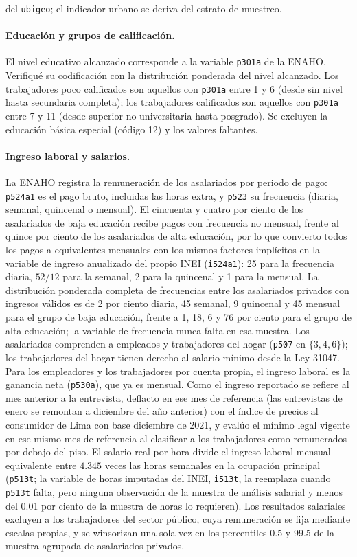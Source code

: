 del \texttt{ubigeo}; el indicador urbano se deriva del estrato de muestreo.

\paragraph{Educación y grupos de calificación.} El nivel educativo alcanzado corresponde a la variable \texttt{p301a} de la ENAHO. Verifiqué su codificación con la distribución ponderada del nivel alcanzado. Los trabajadores poco calificados son aquellos con \texttt{p301a} entre 1 y 6 (desde sin nivel hasta secundaria completa); los trabajadores calificados son aquellos con \texttt{p301a} entre 7 y 11 (desde superior no universitaria hasta posgrado). Se excluyen la educación básica especial (código 12) y los valores faltantes.

\paragraph{Ingreso laboral y salarios.} La ENAHO registra la remuneración de los asalariados por periodo de pago: \texttt{p524a1} es el pago bruto, incluidas las horas extra, y \texttt{p523} su frecuencia (diaria, semanal, quincenal o mensual). El cincuenta y cuatro por ciento de los asalariados de baja educación recibe pagos con frecuencia no mensual, frente al quince por ciento de los asalariados de alta educación, por lo que convierto todos los pagos a equivalentes mensuales con los mismos factores implícitos en la variable de ingreso anualizado del propio INEI (\texttt{i524a1}): 25 para la frecuencia diaria, $52/12$ para la semanal, 2 para la quincenal y 1 para la mensual. La distribución ponderada completa de frecuencias entre los asalariados privados con ingresos válidos es de 2 por ciento diaria, 45 semanal, 9 quincenal y 45 mensual para el grupo de baja educación, frente a 1, 18, 6 y 76 por ciento para el grupo de alta educación; la variable de frecuencia nunca falta en esa muestra. Los asalariados comprenden a empleados y trabajadores del hogar (\texttt{p507} en $\{3,4,6\}$); los trabajadores del hogar tienen derecho al salario mínimo desde la Ley 31047. Para los empleadores y los trabajadores por cuenta propia, el ingreso laboral es la ganancia neta (\texttt{p530a}), que ya es mensual. Como el ingreso reportado se refiere al mes anterior a la entrevista, deflacto en ese mes de referencia (las entrevistas de enero se remontan a diciembre del año anterior) con el índice de precios al consumidor de Lima con base diciembre de 2021, y evalúo el mínimo legal vigente en ese mismo mes de referencia al clasificar a los trabajadores como remunerados por debajo del piso. El salario real por hora divide el ingreso laboral mensual equivalente entre $4.345$ veces las horas semanales en la ocupación principal (\texttt{p513t}; la variable de horas imputadas del INEI, \texttt{i513t}, la reemplaza cuando \texttt{p513t} falta, pero ninguna observación de la muestra de análisis salarial y menos del 0.01 por ciento de la muestra de horas lo requieren). Los resultados salariales excluyen a los trabajadores del sector público, cuya remuneración se fija mediante escalas propias, y se winsorizan una sola vez en los percentiles 0.5 y 99.5 de la muestra agrupada de asalariados privados.

